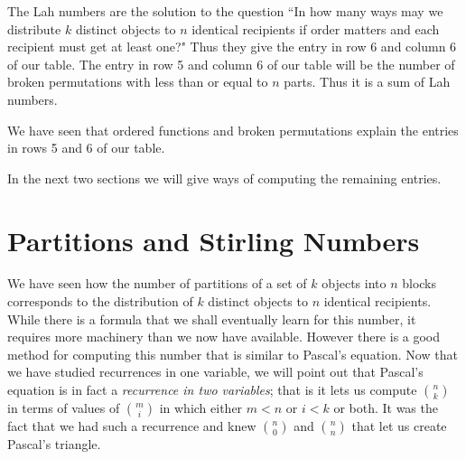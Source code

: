 \documentclass[10pt,]{book}
\theoremstyle{plain}
\theoremstyle{definition}
\theoremstyle{definition}
\numberwithin{equation}{chapter}
\newcommand{\lt}{<}
\begin{document}
\par
The Lah numbers are the solution to the question ``In how many ways may we distribute \(k\) distinct objects to \(n\) identical recipients if order matters and each recipient must get at least one?" Thus they give the entry in row 6 and column 6 of our table. The entry in row 5 and column 6 of our table will be the number of broken permutations with less than or equal to \(n\) parts. Thus it is a sum of Lah numbers.%
\par
We have seen that ordered functions and broken permutations explain the entries in rows 5 and 6 of our table.%
\par
In the next two sections we will give ways of computing the remaining entries.%
\typeout{************************************************}
\typeout{************************************************}
\section[{Partitions and Stirling Numbers}]{Partitions and Stirling Numbers}\label{section-8}
We have seen how the number of partitions of a set of \(k\) objects into \(n\) blocks corresponds to the distribution of \(k\) distinct objects to \(n\) identical recipients. While there is a formula that we shall eventually learn for this number, it requires more machinery than we now have available. However there is a good method for computing this number that is similar to Pascal's equation. Now that we have studied recurrences in one variable, we will point out that Pascal's equation is in fact a \emph{recurrence in two variables}; that is it lets us compute \(\binom{n}{k}\) in terms of values of \(\binom{m}{i}\) in which either \(m\lt n\) or \(i\lt k\) or both. It was the fact that we had such a recurrence and knew \(\binom{n}{0}\) and \(\binom{n}{n}\) that let us create Pascal's triangle.%
\typeout{************************************************}
\typeout{************************************************}
\end{document}

